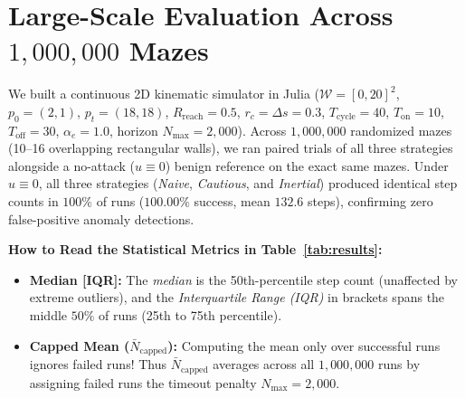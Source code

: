 \documentclass[11pt, a4paper]{article}
\begin{document}
\section{Large-Scale Evaluation Across $1,000,000$ Mazes}
We built a continuous 2D kinematic simulator in Julia ($\mathcal{W} = [0, 20]^2$, $p_0 = (2, 1)$, $p_t = (18, 18)$, $R_{\text{reach}} = 0.5$, $r_c = \Delta s = 0.3$, $T_{\text{cycle}} = 40$, $T_{\text{on}} = 10$, $T_{\text{off}} = 30$, $\alpha_e = 1.0$, horizon $N_{\max} = 2,000$). Across $1,000,000$ randomized mazes (10--16 overlapping rectangular walls), we ran paired trials of all three strategies alongside a no-attack ($u \equiv 0$) benign reference on the exact same mazes. Under $u \equiv 0$, all three strategies (\textit{Naive}, \textit{Cautious}, and \textit{Inertial}) produced identical step counts in $100\%$ of runs ($100.00\%$ success, mean $132.6$ steps), confirming zero false-positive anomaly detections.

\begin{table}[H]
\centering
\small
\caption{Performance Comparison Across $1,000,000$ Paired Environments}
\label{tab:results}
\end{table}

\noindent\textbf{How to Read the Statistical Metrics in Table~\ref{tab:results}:}
\begin{itemize}
    \item \textbf{Median [IQR]:} The \textit{median} is the 50th-percentile step count (unaffected by extreme outliers), and the \textit{Interquartile Range (IQR)} in brackets spans the middle $50\%$ of runs (25th to 75th percentile).
    \item \textbf{Capped Mean ($\bar{N}_{\text{capped}}$):} Computing the mean only over successful runs ignores failed runs! Thus $\bar{N}_{\text{capped}}$ averages across all $1,000,000$ runs by assigning failed runs the timeout penalty $N_{\max} = 2,000$.
\end{itemize}
\end{document}
